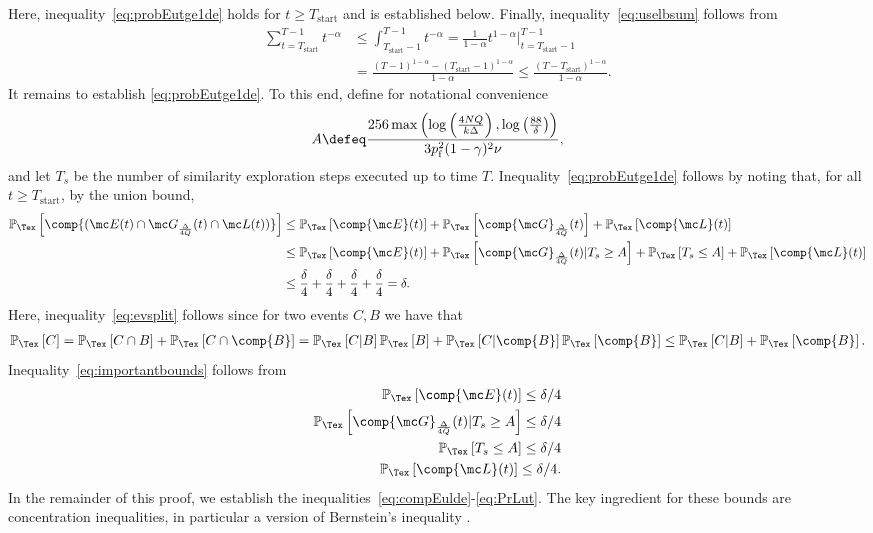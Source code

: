 \documentclass{article}
\newcommand\pf{p_{\mathrm{f}}}
\renewcommand\PR[2][\Tex]{
\ifthenelse{\equal{#1}{}}{{\mathbb P}\left[#2\right]}{\ensuremath{{\mathbb P}_{#1}\left[ #2\right]}}}
\begin{document}
Here, inequality~\eqref{eq:probEutge1de} holds for $t \geq T_{\text{start}}$ and is established below. 
Finally, inequality~\eqref{eq:uselbsum} follows from 
\begin{align}
\sum_{t=T_{\text{start}}}^{T-1}  
t^{-\alpha}
&\leq  \int_{T_{\text{start}} -1}^{T-1} t^{-\alpha}
%
= \frac{1}{1-\alpha} t^{1-\alpha} |_{t=T_{\text{start}} -1}^{T-1} \nonumber \\
%
&= \frac{ (T-1)^{1-\alpha} - (T_{\text{start}}-1)^{1-\alpha} }{1-\alpha} 
%
\leq 
\frac{ (T - T_{\text{start}})^{1-\alpha} }{1-\alpha}. \nonumber
\end{align}
It remains to establish \eqref{eq:probEutge1de}. 
To this end, define for notational convenience 
\[
A 
\defeq 
\frac{256 \max\left(\log\left( \frac{4NQ}{k\Delta} \right), \log\left(\frac{88}{\delta}\right)\right) }{ 3  \pf^2  (1 - \gamma)^2 \nu }, 
\]
and let $T_s$ be the number of similarity exploration steps executed up to time $T$. 
Inequality~\eqref{eq:probEutge1de} follows by noting that, for all $t\geq T_{\text{start}}$, by the union bound, 
\begin{align}
\PR{\comp{(\mc E(t) \cap \mc G_{\frac{\Delta}{4Q}}(t) \cap \mc L(t) )} } 
%
&\leq 
\PR{\comp{\mc E}(t) } 
+
\PR{\comp{\mc G}_{\frac{\Delta}{4Q}}(t)}
+
\PR{\comp{\mc L}(t) } \nonumber \\
% 
&\leq 
\PR{ \comp{\mc E}(t)}
+ 
\PR{ \comp{\mc G}_{\frac{\Delta}{4Q}}(t) | T_s \geq A } +
\PR{ T_s \leq A }
+
\PR{\comp{\mc L}(t) } \label{eq:evsplit} \\
%
&\leq 
\frac{\delta}{4} + \frac{\delta}{4} + \frac{\delta}{4} + \frac{\delta}{4} = \delta. 
\label{eq:importantbounds}
\end{align}
Here, inequality~\eqref{eq:evsplit} follows since for two events $C,B$ we have that
\begin{align}
\label{eq:events}
\PR{C}
=
\PR{C \cap B} + \PR{C \cap \comp{B} }
=
\PR{C|B} \PR{B} + \PR{C|\comp{B}} \PR{ \comp{B} }
\leq 
\PR{C | B} + \PR{\comp{B}}.
\end{align}
Inequality~\eqref{eq:importantbounds} follows from 
\begin{align}
\PR{ \comp{\mc E}(t)  } \leq \delta/4 \label{eq:compEulde} \\
%
\PR{ \comp{\mc G}_{\frac{\Delta}{4Q}}(t) |  T_s \geq A  } \leq \delta/4 \label{eq:neighborhooddel4}\\
%
\PR{  T_s \leq A } \leq \delta/4 \label{eq:PrTjA}\\
%
\PR{\comp{\mc L}(t) } \leq \delta/4 \label{eq:PrLut}.   
\end{align}
In the remainder of this proof, we establish the inequalities~\eqref{eq:compEulde}-\eqref{eq:PrLut}. 
The key ingredient for these bounds are concentration inequalities, in particular a version of Bernstein's inequality \cite{bardenet_concentration_2015}. 
\end{document}
